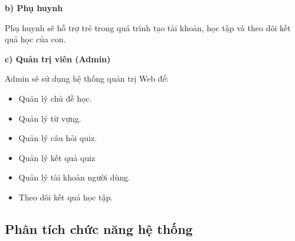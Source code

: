 \noindent\textbf{b) Phụ huynh}


Phụ huynh sẽ hỗ trợ trẻ trong quá trình tạo tài khoản, học tập và theo dõi kết quả học của con.


\noindent\textbf{c) Quản trị viên (Admin)}


Admin sẽ sử dụng hệ thống quản trị Web để:


\begin{itemize}[leftmargin=1.3cm,itemsep=0.3cm]
	\item Quản lý chủ đề học.
	\item Quản lý từ vựng.
	\item Quản lý câu hỏi quiz.
	\item Quản lý kết quả quiz
	\item Quản lý tài khoản người dùng.
	\item Theo dõi kết quả học tập.
\end{itemize}



\subsection{Phân tích chức năng hệ thống}

